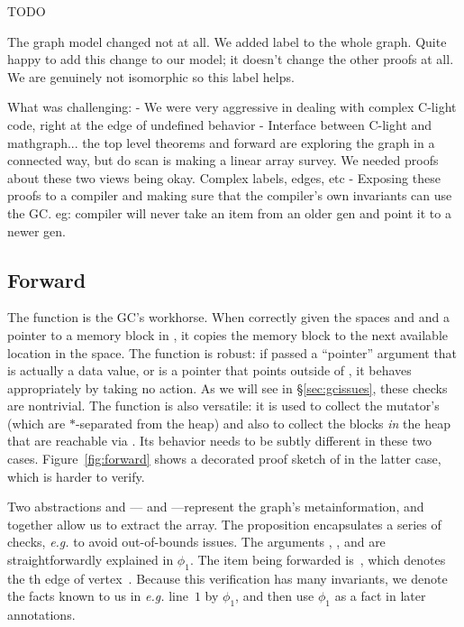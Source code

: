 \hide
{\color{red} TODO

The graph model changed not at all. We added label to the whole graph. Quite happy to add this change to our model; it doesn't change the other proofs at all. We are genuinely not isomorphic so this label helps.

What was challenging:
	- We were very aggressive in dealing with complex C-light code, right at the edge of undefined behavior
	- Interface between C-light and mathgraph... the top level theorems and forward are exploring the graph in a connected way, but do scan is making a linear array survey. We needed proofs about these two views being okay. Complex labels, edges, etc
	- Exposing these proofs to a compiler and making sure that the compiler's own invariants can use the GC. eg: compiler will never take an item from an older gen and point it to a newer gen.
}

\subsection{Forward}
\label{sec:gcforward}

The function  is the GC's workhorse.
When correctly given the spaces  and  and a pointer
 to a memory block in ,
it copies the memory block to the next
available location in the  space.
The function is robust: if passed a ``pointer'' argument
that is actually a data value, or is a pointer that points outside of
, it behaves appropriately by taking no action.
As we will see in \S\ref{sec:gcissues}, these checks are nontrivial.
The function is also versatile: it is used to collect the
mutator's  (which are $*$-separated from the heap)
and also to collect the blocks \emph{in} the heap that are reachable via
. Its behavior needs to be subtly different in these
two cases.
Figure~\ref{fig:forward} shows a decorated proof sketch of 
in the latter case, which is harder to verify.

Two abstractions  
and --- and ---represent the 
graph's metainformation, and together allow us to
extract the  array. The
proposition  encapsulates a series of checks, 
\emph{e.g.} to avoid out-of-bounds issues.
The arguments , , and  are straightforwardly
explained in $\phi_1$. 
The item being forwarded 
is~, which denotes the th edge of vertex~. 
Because this verification has many invariants, 
we denote the facts known to us in
\emph{e.g.} line~$1$ by $\phi_1$, and then use $\phi_1$
as a fact in later annotations.

